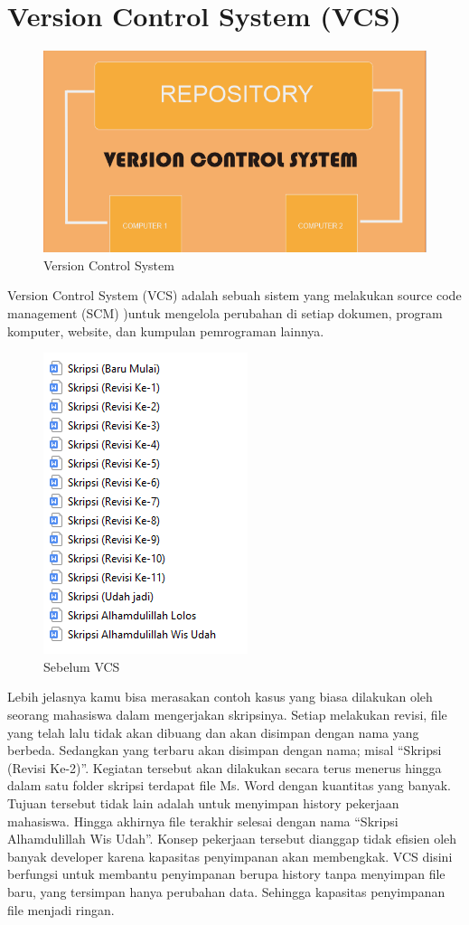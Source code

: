 \section{Version Control System (VCS)}
\begin{figure}[H]
        \centerline{\includegraphics[scale=0.35]{figures/version-control-system/vcs}}
        \caption{Version Control System}
\end{figure}
Version Control System (VCS) adalah sebuah sistem yang melakukan source code management (SCM) )untuk mengelola perubahan di setiap dokumen, program komputer, website, dan kumpulan pemrograman lainnya.
\begin{figure}[H]
        \centerline{\includegraphics[scale=0.5]{figures/version-control-system/before-vcs}}
        \caption{Sebelum VCS}
\end{figure}
Lebih jelasnya kamu bisa merasakan contoh kasus yang biasa dilakukan oleh seorang mahasiswa dalam mengerjakan skripsinya. Setiap melakukan revisi, file yang telah lalu tidak akan dibuang dan akan disimpan dengan nama yang berbeda. Sedangkan yang terbaru akan disimpan dengan nama; misal “Skripsi (Revisi Ke-2)”. Kegiatan tersebut akan dilakukan secara terus menerus hingga dalam satu folder skripsi terdapat file Ms. Word dengan kuantitas yang banyak. Tujuan tersebut tidak lain adalah untuk menyimpan history pekerjaan mahasiswa. Hingga akhirnya file terakhir selesai dengan nama “Skripsi Alhamdulillah Wis Udah”. Konsep pekerjaan tersebut dianggap tidak efisien oleh banyak developer karena kapasitas penyimpanan akan membengkak. VCS disini berfungsi untuk membantu penyimpanan berupa history tanpa menyimpan file baru, yang tersimpan hanya perubahan data. Sehingga kapasitas penyimpanan file menjadi ringan.
